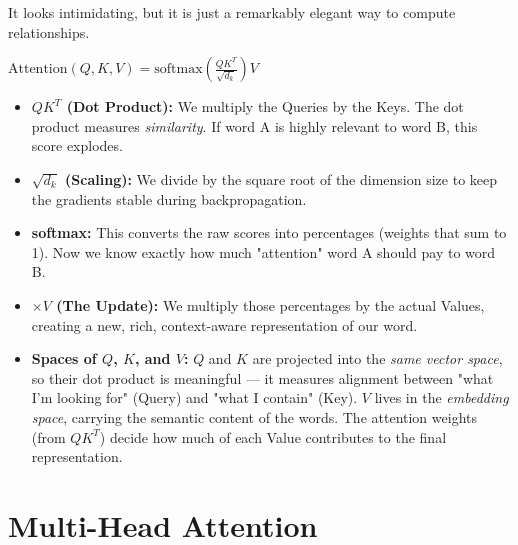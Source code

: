 \documentclass[11pt]{article}
\begin{document}
\vspace{0.05in}

{\fontsize{10}{12}\selectfont\color{brandgray}
It looks intimidating, but it is just a remarkably elegant way to compute relationships.
}

\vspace{0.15in}

\begin{center}
{\Large $\text{Attention}(Q, K, V) = \text{softmax}\left(\frac{QK^T}{\sqrt{d_k}}\right)V$}
\end{center}

\vspace{0.15in}

\begin{itemize}[leftmargin=*, itemsep=0.15in, label={\color{brandblue}\textbullet}]
    \item \textbf{$QK^T$ (Dot Product):} We multiply the Queries by the Keys. The dot product measures \textit{similarity}. If word A is highly relevant to word B, this score explodes.
    \item \textbf{$\sqrt{d_k}$ (Scaling):} We divide by the square root of the dimension size to keep the gradients stable during backpropagation.
    \item \textbf{softmax:} This converts the raw scores into percentages (weights that sum to 1). Now we know exactly how much "attention" word A should pay to word B.
    \item \textbf{$\times V$ (The Update):} We multiply those percentages by the actual Values, creating a new, rich, context-aware representation of our word.
    \item \textbf{Spaces of $Q$, $K$, and $V$:} 
         $Q$ and $K$ are projected into the \textit{same vector space}, so their dot product is meaningful — it measures alignment between "what I’m looking for" (Query) and "what I contain" (Key).  
        $V$ lives in the \textit{embedding space}, carrying the semantic content of the words. The attention weights (from $QK^T$) decide how much of each Value contributes to the final representation.
\end{itemize}


\vfill
\newpage


\section*{Multi-Head Attention}
\end{document}
